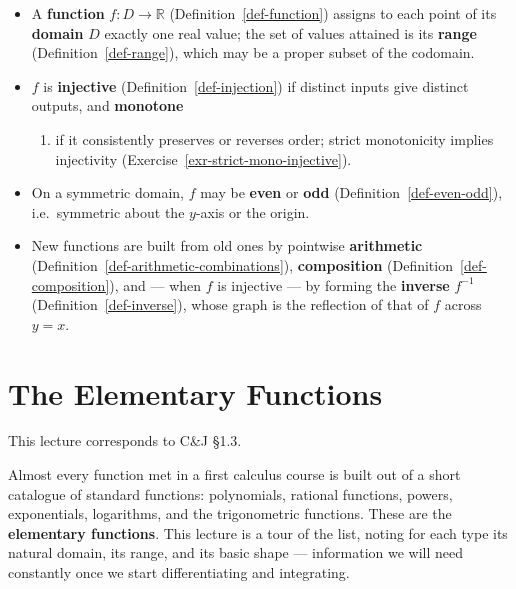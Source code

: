 \documentclass[
  letterpaper,
  DIV=11,
  numbers=noendperiod]{scrreprt}
\providecommand{\tightlist}{%
  \setlength{\itemsep}{0pt}\setlength{\parskip}{0pt}}
\theoremstyle{plain}
\theoremstyle{plain}
\theoremstyle{definition}
\theoremstyle{definition}
\theoremstyle{definition}
\theoremstyle{plain}
\theoremstyle{plain}
\theoremstyle{remark}
\begin{document}
\begin{itemize}
\tightlist
\item
  A \textbf{function} \(f\colon D\to\mathbb{R}\)
  (Definition~\ref{def-function}) assigns to each point of its
  \textbf{domain} \(D\) exactly one real value; the set of values
  attained is its \textbf{range} (Definition~\ref{def-range}), which may
  be a proper subset of the codomain.
\item
  \(f\) is \textbf{injective} (Definition~\ref{def-injection}) if
  distinct inputs give distinct outputs, and \textbf{monotone}

  \begin{enumerate}
  \def\labelenumi{(\arabic{enumi})}
  \tightlist
  \item
    if it consistently preserves or reverses order; strict monotonicity
    implies injectivity (Exercise~\ref{exr-strict-mono-injective}).
  \end{enumerate}
\item
  On a symmetric domain, \(f\) may be \textbf{even} or \textbf{odd}
  (Definition~\ref{def-even-odd}), i.e.~symmetric about the \(y\)-axis
  or the origin.
\item
  New functions are built from old ones by pointwise \textbf{arithmetic}
  (Definition~\ref{def-arithmetic-combinations}), \textbf{composition}
  (Definition~\ref{def-composition}), and --- when \(f\) is injective
  --- by forming the \textbf{inverse} \(f^{-1}\)
  (Definition~\ref{def-inverse}), whose graph is the reflection of that
  of \(f\) across \(y=x\).
\end{itemize}

\chapter{The Elementary Functions}\label{the-elementary-functions}

\begin{tcolorbox}[enhanced jigsaw, arc=.35mm, bottomrule=.15mm, bottomtitle=1mm, breakable, colback=white, colbacktitle=quarto-callout-note-color!10!white, colframe=quarto-callout-note-color-frame, coltitle=black, left=2mm, leftrule=.75mm, opacityback=0, opacitybacktitle=0.6, rightrule=.15mm, title={Companion reading}, titlerule=0mm, toprule=.15mm, toptitle=1mm]

This lecture corresponds to C\&J §1.3.

\end{tcolorbox}

Almost every function met in a first calculus course is built out of a
short catalogue of standard functions: polynomials, rational functions,
powers, exponentials, logarithms, and the trigonometric functions. These
are the \textbf{elementary functions}. This lecture is a tour of the
list, noting for each type its natural domain, its range, and its basic
shape --- information we will need constantly once we start
differentiating and integrating.
\end{document}
